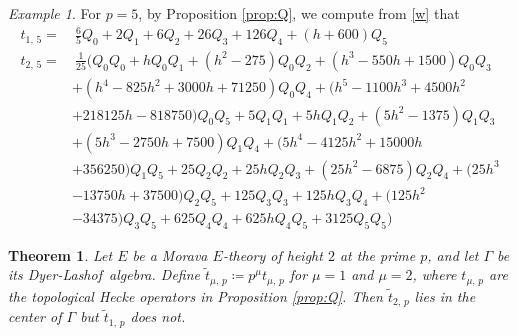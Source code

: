 \documentclass{gtpart}
\newtheorem{thm}[equation]{Theorem}
\theoremstyle{definition}
\theoremstyle{remark}
\newtheorem{ex}[equation]{Example}
\newcommand{\DL}{Dyer-Lashof~}
\newcommand{\G}{\Gamma}
\newcommand{\ce}{\coloneqq}
\renewcommand{\=}{\approx}
\renewcommand{\-}{\sim}
\numberwithin{equation}{section}
\begin{document}
\begin{ex}
 \label{ex:t5}
 For $p = 5$, by Proposition \ref{prop:Q}, we compute from \eqref{w} that 
 \begin{equation*}
  \begin{split}
   t_{1,\,5} = & ~ \frac{6}{5} Q_0 + 2 Q_1 + 6 Q_2 + 26 Q_3 + 126 Q_4 
                 + (h + 600) Q_5 \\
   t_{2,\,5} = & ~ \frac{1}{25} \big( Q_0 Q_0 + h Q_0 Q_1 + (h^2 - 275) Q_0 Q_2 
                 + (h^3 - 550 h + 1500) Q_0 Q_3 \\
               & + (h^4 - 825 h^2 + 3000 h + 71250) Q_0 Q_4 + (h^5 - 1100 h^3 
                 + 4500 h^2 \\
               & + 218125 h - 818750) Q_0 Q_5 + 5 Q_1 Q_1 + 5 h Q_1 Q_2 + (5 h^2 
                 - 1375) Q_1 Q_3 \\
               & + (5 h^3 - 2750 h + 7500) Q_1 Q_4 + (5 h^4 - 4125 h^2 
                 + 15000 h \\
               & + 356250) Q_1 Q_5 + 25 Q_2 Q_2 + 25 h Q_2 Q_3 + (25 h^2 
                 - 6875) Q_2 Q_4 + (25 h^3 \\
               & - 13750 h + 37500) Q_2 Q_5 + 125 Q_3 Q_3 + 125 h Q_3 Q_4 
                 + (125 h^2 \\
               & - 34375) Q_3 Q_5 + 625 Q_4 Q_4 + 625 h Q_4 Q_5 
                 + 3125 Q_5 Q_5 \big) 
  \end{split}
 \end{equation*}
\end{ex}

\begin{thm}
 \label{thm:center}
 Let $E$ be a Morava $E$-theory of height $2$ at the prime $p$, and let $\G$ be 
 its \DL algebra.  Define $\tilde{t}_{\mu,\,p} \ce p^\mu t_{\mu,\,p}$ for 
 $\mu = 1$ and $\mu = 2$, where $t_{\mu,\,p}$ are the topological Hecke 
 operators in Proposition \ref{prop:Q}.  Then $\tilde{t}_{2,\,p}$ lies in the 
 center of $\G$ but $\tilde{t}_{1,\,p}$ does not.  
\end{thm}
\end{document}
